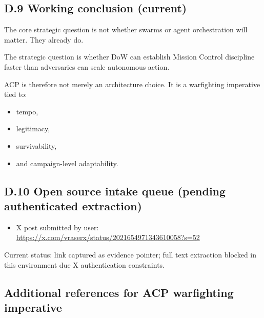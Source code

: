\documentclass[
]{article}
\providecommand{\tightlist}{%
  \setlength{\itemsep}{0pt}\setlength{\parskip}{0pt}}
\begin{document}
\hypertarget{d.9-working-conclusion-current}{%
\subsection{D.9 Working conclusion
(current)}\label{d.9-working-conclusion-current}}

The core strategic question is not whether swarms or agent orchestration
will matter. They already do.

The strategic question is whether DoW can establish Mission Control
discipline faster than adversaries can scale autonomous action.

ACP is therefore not merely an architecture choice. It is a warfighting
imperative tied to:

\begin{itemize}
\tightlist
\item
  tempo,
\item
  legitimacy,
\item
  survivability,
\item
  and campaign-level adaptability.
\end{itemize}

\hypertarget{d.10-open-source-intake-queue-pending-authenticated-extraction}{%
\subsection{D.10 Open source intake queue (pending authenticated
extraction)}\label{d.10-open-source-intake-queue-pending-authenticated-extraction}}

\begin{itemize}
\tightlist
\item
  X post submitted by user:\\
  \url{https://x.com/vraserx/status/2021654971343610058?s=52}
\end{itemize}

Current status: link captured as evidence pointer; full text extraction
blocked in this environment due X authentication constraints.

\hypertarget{additional-references-for-acp-warfighting-imperative}{%
\subsection{Additional references for ACP warfighting
imperative}\label{additional-references-for-acp-warfighting-imperative}}
\end{document}

